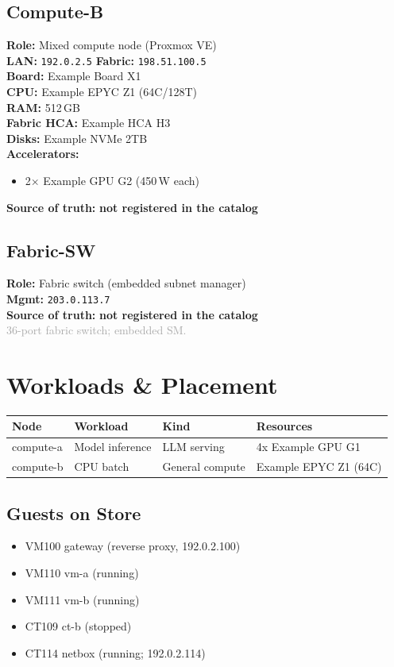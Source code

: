 \documentclass[11pt]{article}
\begin{document}
\subsection{Compute-B}
\textbf{Role:} Mixed compute node (Proxmox VE)\\
\textbf{LAN:} \texttt{192.0.2.5} \quad \textbf{Fabric:} \texttt{198.51.100.5}\\
\textbf{Board:} Example Board X1\\
\textbf{CPU:} Example EPYC Z1 (64C/128T)\\
\textbf{RAM:} 512\,GB\\
\textbf{Fabric HCA:} Example HCA H3\\
\textbf{Disks:} Example NVMe 2TB\\
\textbf{Accelerators:}\begin{itemize}[nosep,leftmargin=1.4em]\item 2$\times$ Example GPU G2 (450\,W each)
\end{itemize}
\textbf{Source of truth:} \textcolor{accent}{\textbf{not registered in the catalog}}\\
\subsection{Fabric-SW}
\textbf{Role:} Fabric switch (embedded subnet manager)\\
\textbf{Mgmt:} \texttt{203.0.113.7}\\
\textbf{Source of truth:} \textcolor{accent}{\textbf{not registered in the catalog}}\\
\textcolor{darkgray}{36-port fabric switch; embedded SM.}

\section{Workloads \& Placement}
\begin{tabularx}{\textwidth}{l l l X}
\toprule
\textbf{Node} & \textbf{Workload} & \textbf{Kind} & \textbf{Resources} \\
\midrule
compute-a & Model inference & LLM serving & 4x Example GPU G1 \\
compute-b & CPU batch & General compute & Example EPYC Z1 (64C) \\
\bottomrule
\end{tabularx}
\subsection{Guests on Store}\begin{itemize}[nosep,leftmargin=1.4em]\item VM100 gateway (reverse proxy, 192.0.2.100)
\item VM110 vm-a (running)
\item VM111 vm-b (running)
\item CT109 ct-b (stopped)
\item CT114 netbox (running; 192.0.2.114)
\end{itemize}
\end{document}
